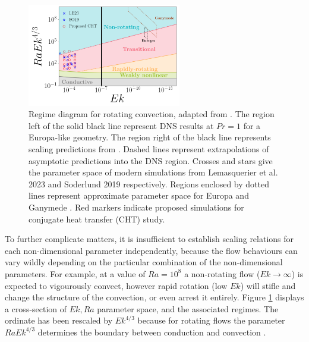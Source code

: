 \documentclass{article}
\begin{document}
\begin{figure}
	\begin{center}
		\includegraphics[width=0.6\textwidth]{figures/reg_diagram}
	\end{center}
	\caption{Regime diagram for rotating convection, adapted from \citep{dL23,tG16}. The region left of the solid black line represent DNS results at $Pr = 1$ for a Europa-like geometry\citep{aB22}. The region right of the black line represents scaling predictions from \citep{tG16}. Dashed lines represent extrapolations of asymptotic predictions into the DNS region. Crosses and stars give the parameter space of modern simulations from Lemasquerier et al. 2023\citep{dL23} and Soderlund 2019\citep{kS19} respectively. Regions enclosed by dotted lines represent approximate parameter space for Europa and Ganymede \citep{dL23,kS19}. Red markers indicate proposed simulations for conjugate heat transfer (CHT) study.}
	\label{f:reg_d}
\end{figure}

To further complicate matters, it is insufficient to establish scaling relations for each non-dimensional parameter independently, because the flow behaviours can vary wildly depending on the particular combination of the non-dimensional parameters. 
For example, at a value of $Ra = 10^{8}$ a non-rotating flow ($Ek\rightarrow \infty$) is expected to vigourously convect, however rapid rotation (low  $Ek$) will stifle and change the structure of the convection, or even arrest it entirely. 
Figure \ref{f:reg_d} displays a cross-section of $Ek,Ra$ parameter space, and the associated regimes. The ordinate has been rescaled by $Ek^{4/3}$ because for rotating flows the parameter $RaEk^{4/3}$ determines the boundary between conduction and convection \citep[e.g. ][]{sC61}.
\end{document}

